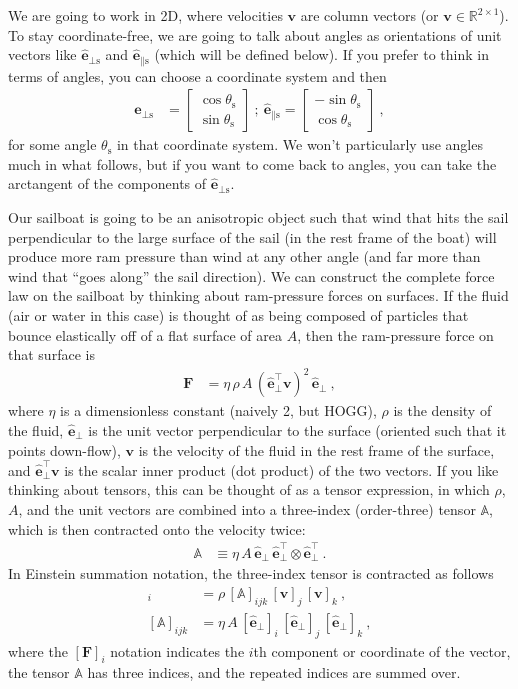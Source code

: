 \documentclass{article}
\renewcommand{\vec}[1]{\boldsymbol{#1}}
\newcommand{\uvec}{\vec{\hat{e}}}
\newcommand{\sail}{\text{s}}
\begin{document}
We are going to work in 2D, where velocities $\vec{v}$ are column vectors (or $\vec{v}\in\mathbb{R}^{2\times 1}$).
To stay coordinate-free, we are going to talk about angles as orientations of unit vectors like $\uvec_{\perp\sail}$ and $\uvec_{\parallel\sail}$ (which will be defined below).
If you prefer to think in terms of angles, you can choose a coordinate system and then
\begin{align}
    \uvec_{\perp\sail} &= \begin{bmatrix}\cos\theta_\sail \\ \sin\theta_\sail\end{bmatrix} ~ ; ~ \uvec_{\parallel\sail} = \begin{bmatrix}-\sin\theta_\sail \\ \cos\theta_\sail\end{bmatrix} ~,
\end{align}
for some angle $\theta_\sail$ in that coordinate system.
We won't particularly use angles much in what follows, but if you want to come back to angles, you can take the arctangent of the components of $\uvec_{\perp\sail}$.

Our sailboat is going to be an anisotropic object such that wind that hits the sail perpendicular to the large surface of the sail (in the rest frame of the boat) will produce more ram pressure than wind at any other angle (and far more than wind that ``goes along'' the sail direction).
We can construct the complete force law on the sailboat by thinking about ram-pressure forces on surfaces.
If the fluid (air or water in this case) is thought of as being composed of particles that bounce elastically off of a flat surface of area $A$, then the ram-pressure force on that surface is
\begin{align}
    \vec{F} &= \eta\,\rho\,A\,(\uvec_\perp^\top\vec{v})^2\,\uvec_\perp ~,
\end{align}
where $\eta$ is a dimensionless constant (naively 2, but HOGG), $\rho$ is the density of the fluid, $\uvec_\perp$ is the unit vector perpendicular to the surface (oriented such that it points down-flow), $\vec{v}$ is the velocity of the fluid in the rest frame of the surface, and $\uvec_\perp^\top\vec{v}$ is the scalar inner product (dot product) of the two vectors.
If you like thinking about tensors, this can be thought of as a tensor expression, in which $\rho$, $A$, and the unit vectors are combined into a three-index (order-three) tensor $\mathbb{A}$, which is then contracted onto the velocity twice:
\begin{align}
    \mathbb{A} &\equiv \eta\,A\,\uvec_\perp\,\uvec_\perp^\top\otimes\uvec_\perp^\top ~.
\end{align}
In Einstein summation notation, the three-index tensor is contracted as follows
\begin{align}
    [\vec{F}]_i &= \rho\,[\mathbb{A}]_{ijk}\,[\vec{v}]_j\,[\vec{v}]_k ~,
    \\
    [\mathbb{A}]_{ijk} &= \eta\,A\,[\uvec_\perp]_i\,[\uvec_\perp]_j\,[\uvec_\perp]_k
    ~,
\end{align}
where the $[\vec{F}]_i$ notation indicates the $i$th component or coordinate of the vector, the tensor $\mathbb{A}$ has three indices, and the repeated indices are summed over.
\end{document}
